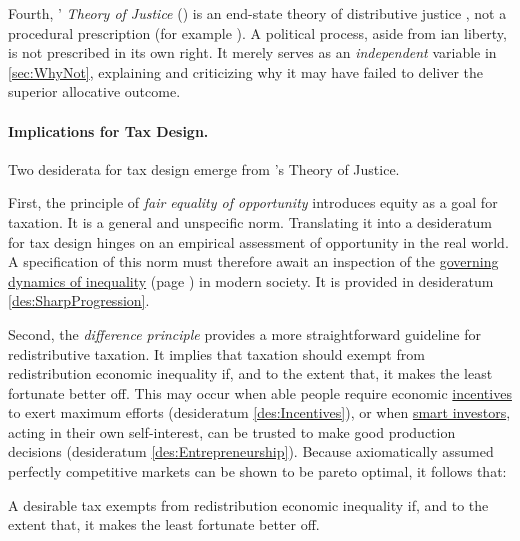 Fourth, \citeauthor{Rawls-1971}' \emph{Theory of Justice} (\citeyear{Rawls-1971}) is an end-state theory of distributive justice \citep[1007]{Fried1999}, not a procedural prescription (for example \citealt{Dahl-1989-aa}).
A political process, aside from \citeauthor{Rawls-1971}ian liberty, is not prescribed in its own right.
It merely serves as an \emph{independent} variable in \autoref{sec:WhyNot}, explaining and criticizing why it may have failed to deliver the superior allocative outcome.

\paragraph{Implications for Tax Design.}
Two desiderata for tax design emerge from \citeauthor{Rawls-1971}'s Theory of Justice.

First, the principle of \emph{fair equality of opportunity} introduces equity as a goal for taxation.
It is a general and unspecific norm.
Translating it into a desideratum for tax design hinges on an empirical assessment of  opportunity
 in the real world.
A specification of this norm must therefore await an inspection of the \hyperref[sec:GovDynofIneq]{governing dynamics of inequality} (page \pageref{sec:GovDynofIneq}) in modern society.
It is provided in desideratum \ref{des:SharpProgression}.

Second, the \emph{difference principle} provides a more straightforward guideline for redistributive taxation.
It implies that taxation should exempt from redistribution economic inequality if, and to the extent that, it makes the least fortunate better off.
This may occur when able people require economic \hyperref[des:Incentives]{incentives} to exert maximum efforts (desideratum \ref{des:Incentives}), or when \hyperref[des:Entrepreneurship]{smart investors}, acting in their own self-interest, can be trusted to make good production decisions (desideratum \ref{des:Entrepreneurship}).
Because axiomatically assumed perfectly competitive markets can be shown to be pareto optimal, it follows that:

\begin{desideratum}
	\label{des:DifferencePrinciple}
	A desirable tax exempts from redistribution economic inequality if, and to the extent that, it makes the least fortunate better off.
\end{desideratum}

